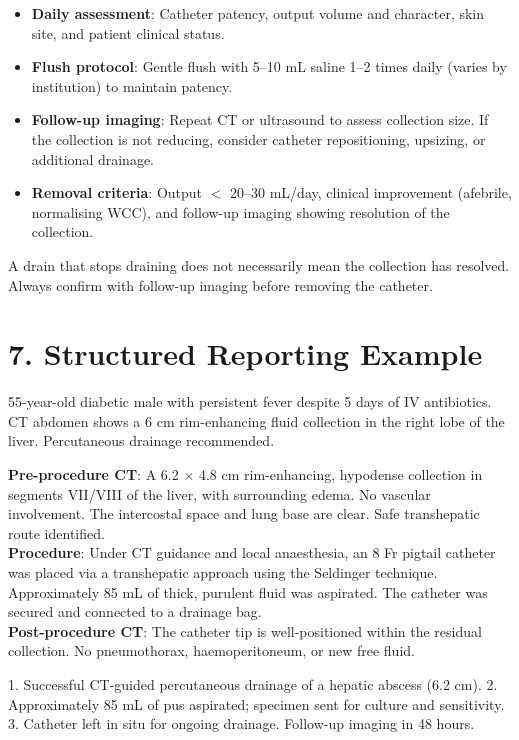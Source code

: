 \begin{itemize}
  \item \textbf{Daily assessment}: Catheter patency, output volume and character, skin site, and patient clinical status.
  \item \textbf{Flush protocol}: Gentle flush with 5--10 mL saline 1--2 times daily (varies by institution) to maintain patency.
  \item \textbf{Follow-up imaging}: Repeat CT or ultrasound to assess collection size. If the collection is not reducing, consider catheter repositioning, upsizing, or additional drainage.
  \item \textbf{Removal criteria}: Output $<$ 20--30 mL/day, clinical improvement (afebrile, normalising WCC), and follow-up imaging showing resolution of the collection.
\end{itemize}

\begin{pearlbox}
A drain that stops draining does not necessarily mean the collection has resolved. Always confirm with follow-up imaging before removing the catheter.
\end{pearlbox}


\section{7. Structured Reporting Example}

\begin{testbox}[Indications:]
55-year-old diabetic male with persistent fever despite 5 days of IV antibiotics. CT abdomen shows a 6 cm rim-enhancing fluid collection in the right lobe of the liver. Percutaneous drainage recommended.
\end{testbox}
\begin{refbox}[Findings:]
\textbf{Pre-procedure CT}: A 6.2 $\times$ 4.8 cm rim-enhancing, hypodense collection in segments VII/VIII of the liver, with surrounding edema. No vascular involvement. The intercostal space and lung base are clear. Safe transhepatic route identified.\\
\textbf{Procedure}: Under CT guidance and local anaesthesia, an 8 Fr pigtail catheter was placed via a transhepatic approach using the Seldinger technique. Approximately 85 mL of thick, purulent fluid was aspirated. The catheter was secured and connected to a drainage bag.\\
\textbf{Post-procedure CT}: The catheter tip is well-positioned within the residual collection. No pneumothorax, haemoperitoneum, or new free fluid.
\end{refbox}
\begin{pearlbox}[Impression:]
1. Successful CT-guided percutaneous drainage of a hepatic abscess (6.2 cm).
2. Approximately 85 mL of pus aspirated; specimen sent for culture and sensitivity.
3. Catheter left in situ for ongoing drainage. Follow-up imaging in 48 hours.
\end{pearlbox}

\clearpage
